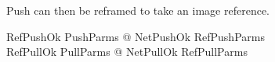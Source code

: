 \documentclass[a4paper,twoside,12pt]{article}
\begin{document}
Push can then be reframed to take an image reference.
\begin{zed}
  RefPushOk  \exists PushParms @ NetPushOk \land RefPushParms \\
  RefPullOk  \exists PullParms @ NetPullOk \land RefPullParms \\
\end{zed}



\clearpage

\appendix





\end{document}
